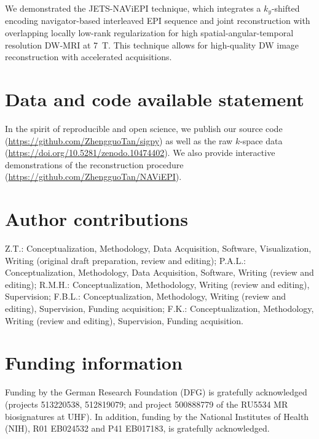 \documentclass[preprint,12pt,authoryear,review]{elsarticle}
\begin{document}
    We demonstrated the JETS-NAViEPI technique, which integrates
    a $k_y$-shifted encoding navigator-based interleaved EPI sequence
    and joint reconstruction with overlapping locally low-rank regularization
    for high spatial-angular-temporal resolution DW-MRI at \SI{7}{\tesla}.
    This technique allows for high-quality DW image reconstruction
    with accelerated acquisitions.

    \section*{Data and code available statement}

    In the spirit of reproducible and open science,
    we publish our source code
    (\url{https://github.com/ZhengguoTan/sigpy})
    as well as the raw $k$-space data
    (\url{https://doi.org/10.5281/zenodo.10474402}).
    We also provide interactive demonstrations
    of the reconstruction procedure
    (\url{https://github.com/ZhengguoTan/NAViEPI}).

    \section*{Author contributions}

    Z.T.: Conceptualization, Methodology, Data Acquisition,
    Software, Visualization,
    Writing (original draft preparation, review and editing);
    P.A.L.: Conceptualization, Methodology, Data Acquisition,
    Software, Writing (review and editing);
    R.M.H.: Conceptualization, Methodology, Writing (review and editing),
    Supervision;
    F.B.L.: Conceptualization, Methodology, Writing (review and editing),
    Supervision, Funding acquisition;
    F.K.: Conceptualization, Methodology, Writing (review and editing),
    Supervision, Funding acquisition.

    \section*{Funding information}

    Funding by the German Research Foundation (DFG)
    is gratefully acknowledged
    (projects 513220538, 512819079;
    and project 500888779 of the RU5534 MR biosignatures at UHF).
    In addition, funding by the National Institutes of Health (NIH),
    R01 EB024532 and P41 EB017183, is gratefully acknowledged.
\end{document}
